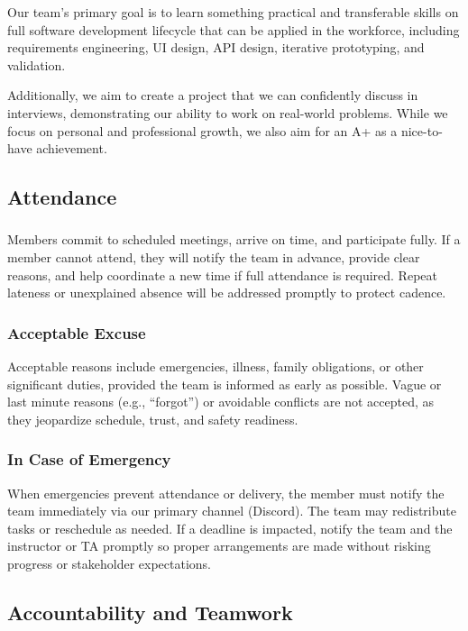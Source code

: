 \documentclass{article}
\begin{document}
Our team's primary goal is to learn something practical and transferable skills
on full software development lifecycle that can be applied in the workforce,
including requirements engineering, UI design, API design, iterative
prototyping, and validation.

Additionally, we aim to create a project that we can confidently discuss in
interviews, demonstrating our ability to work on real-world problems. While we
focus on personal and professional growth, we also aim for an A+ as a
nice-to-have achievement.

\subsection*{Attendance}

\subsubsection*{\color{blue}{Expectations}}

Members commit to scheduled meetings, arrive on time, and participate fully. If
a member cannot attend, they will notify the team in advance, provide clear
reasons, and help coordinate a new time if full attendance is required. Repeat
lateness or unexplained absence will be addressed promptly to protect cadence.

\subsubsection*{\color{blue}Acceptable Excuse}

Acceptable reasons include emergencies, illness, family obligations, or other
significant duties, provided the team is informed as early as possible. Vague
or last minute reasons (e.g., ``forgot'') or avoidable conflicts are not
accepted, as they jeopardize schedule, trust, and safety readiness.

\subsubsection*{\color{blue}In Case of Emergency}

When emergencies prevent attendance or delivery, the member must notify the
team immediately via our primary channel (Discord). The team may redistribute
tasks or reschedule as needed. If a deadline is impacted, notify the team and
the instructor or TA promptly so proper arrangements are made without risking
progress or stakeholder expectations.
\subsection*{Accountability and Teamwork}
\end{document}

